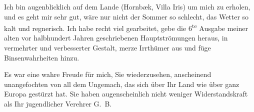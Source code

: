 \pstart
           Ich bin augenblicklich auf dem Lande (Hornbæk,
                  Villa Iris) um mich zu erholen, und es geht
               mir sehr gut, wäre nur nicht der Sommer so schlecht, das Wetter so kalt und
               regnerisch. Ich habe recht viel gearbeitet, gebe die 6\textsuperscript{te}
               Ausgabe meiner alten vor halbhundert Jahren geschriebenen Hauptströmungen heraus, in vermehrter und verbesserter Gestalt,
               merze {\pb}Irrthümer aus und füge
               Binsenwahrheiten hinzu.\pend
           
\pstart
           Es war eine wahre Freude für mich, Sie wiederzusehen, anscheinend unangefochten von
               all dem Ungemach, das sich über Ihr Land wie über ganz Europa gestürzt hat. Sie haben augenscheinlich nicht weniger
               Widerstandskraft als Ihr jugendlicher Verehrer\pend
           \pstart \spacefill\mbox{G. B.}\pend{}
\pstart
           \noindent{}\label{T_L02401-1v}\label{T_L02401-1}\pend
           \endnumbering{}  
      